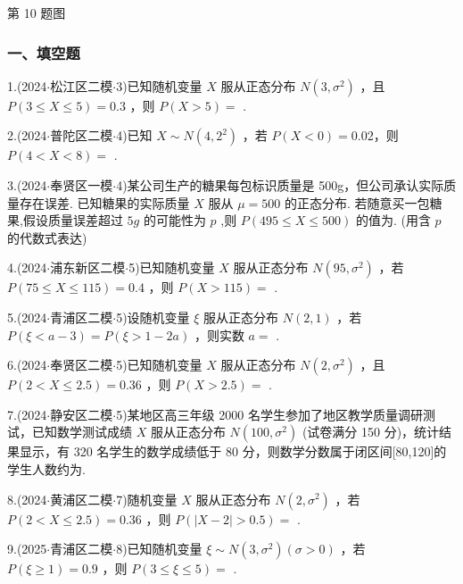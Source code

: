 第 10 题图

\subsubsection*{一、填空题}

1.(2024$\cdot$松江区二模$\cdot$3)已知随机变量 $X$ 服从正态分布 $N\left( {3,{\sigma }^{2}}\right)$ ，且 $P\left( {3 \leq  X \leq  5}\right)  = {0.3}$ ，则 $P\left( {X > 5}\right)  =$ \blkda[2]{}.

2.(2024$\cdot$普陀区二模$\cdot$4)已知 $X \sim  N\left( {4,{2}^{2}}\right)$ ，若 $P\left( {X < 0}\right)  = 0$.02，则 $P\left( {4 < X < 8}\right)  =$ \blkda[2]{}.

3.(2024$\cdot$奉贤区一模$\cdot$4)某公司生产的糖果每包标识质量是 500g，但公司承认实际质量存在误差. 已知糖果的实际质量 $X$ 服从 $\mu  = {500}$ 的正态分布. 若随意买一包糖果,假设质量误差超过 $5{g}$ 的可能性为 $p$ ,则 $P\left( {{495} \leq  X \leq  {500}}\right)$ 的值为\blkda[2]{}. (用含 $p$ 的代数式表达)

4.(2024$\cdot$浦东新区二模$\cdot$5)已知随机变量 $X$ 服从正态分布 $N\left( {{95},{\sigma }^{2}}\right)$ ，若 $P\left( {{75} \leq  X \leq  {115}}\right)  = {0.4}$ ，则 $P\left( {X > {115}}\right)  =$ \blkda[2]{}.

5.(2024$\cdot$青浦区二模$\cdot$5)设随机变量 $\xi$ 服从正态分布 $N\left( {2,1}\right)$ ，若 $P\left( {\xi  < a - 3}\right)  = P\left( {\xi  > 1 - {2a}}\right)$ ，则实数 $a =$ \blkda[2]{}.

6.(2024$\cdot$奉贤区二模$\cdot$5)已知随机变量 $X$ 服从正态分布 $N\left( {2,{\sigma }^{2}}\right)$ ，且 $P\left( {2 < X \leq  {2.5}}\right)  = {0.36}$ ，则 $P\left( {X > {2.5}}\right)  =$ \blkda[2]{}.

7.(2024$\cdot$静安区二模$\cdot$5)某地区高三年级 2000 名学生参加了地区教学质量调研测试，已知数学测试成绩 $X$ 服从正态分布 $N\left( {{100},{\sigma }^{2}}\right)$ (试卷满分 150 分)，统计结果显示，有 320 名学生的数学成绩低于 80 分，则数学分数属于闭区间[80,120]的学生人数约为\blkda[2]{}.

8.(2024$\cdot$黄浦区二模$\cdot$7)随机变量 $X$ 服从正态分布 $N\left( {2,{\sigma }^{2}}\right)$ ，若 $P\left( {2 < X \leq  {2.5}}\right)  = {0.36}$ ，则 $P\left( {\left| {X - 2}\right|  > {0.5}}\right)  =$ \blkda[2]{}.

9.(2025$\cdot$青浦区二模$\cdot$8)已知随机变量 $\xi  \sim  N\left( {3,{\sigma }^{2}}\right) \left( {\sigma  > 0}\right)$ ，若 $P\left( {\xi  \geq  1}\right)  = {0.9}$ ，则 $P\left( {3 \leq  \xi  \leq  5}\right)  =$ \blkda[2]{}.


